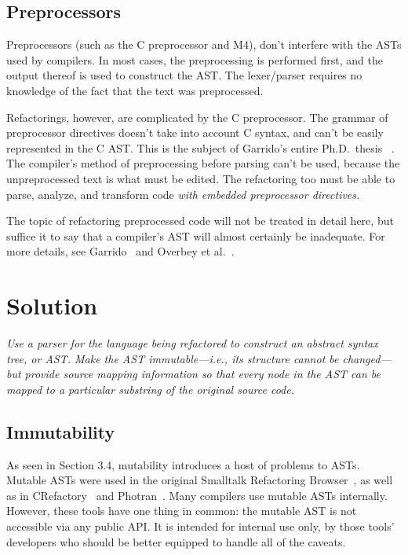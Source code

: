 \documentclass[prodmode]{acmlarge}
\begin{document}
\subsection{Preprocessors}
Preprocessors (such as the C preprocessor and M4), don't interfere with the ASTs
used by compilers. In most cases, the preprocessing is performed first, and the
output thereof is used to construct the AST. The lexer/parser requires no 
knowledge of the fact that the text was preprocessed.

Refactorings, however, are complicated by the C preprocessor. The grammar of 
preprocessor directives doesn't take into account C syntax, and can't be easily
represented in the C AST. This is the subject of Garrido's entire Ph.D.~thesis~%
\cite{garrido05program}. The compiler's method of preprocessing before parsing
can't be used, because the unpreprocessed text is what must be edited. The 
refactoring too must be able to parse, analyze, and transform code \textit{
with embedded preprocessor directives.}

The topic of refactoring preprocessed code will not be treated in detail here,
but suffice it to say that a compiler's AST will almost certainly be inadequate.
For more details, see Garrido~\cite{garrido2013} and Overbey et al.~\cite{wrt2009}.

\section{Solution}

\textit{Use a parser for the language being refactored to construct an
\textup{abstract syntax tree}, or \textup{AST}.  Make the AST
\textup{immutable}---i.e., its structure cannot be changed---but provide
\textup{source mapping} information so that every node in the AST can be mapped
to a particular substring of the original source code.}

\subsection{Immutability}
As seen in Section 3.4, mutability introduces a host of problems to ASTs. Mutable ASTs were used in the original Smalltalk Refactoring
Browser~\cite{roberts97refactoring}, as well as in
CRefactory~\cite{garrido05program} and Photran~\cite{sle2008}.  Many compilers
use mutable ASTs internally.  However, these tools have one thing in common:
the mutable AST is not accessible via any public API.  It is intended for
internal use only, by those tools' developers who should be better equipped to handle all of
the caveats.
\end{document}
